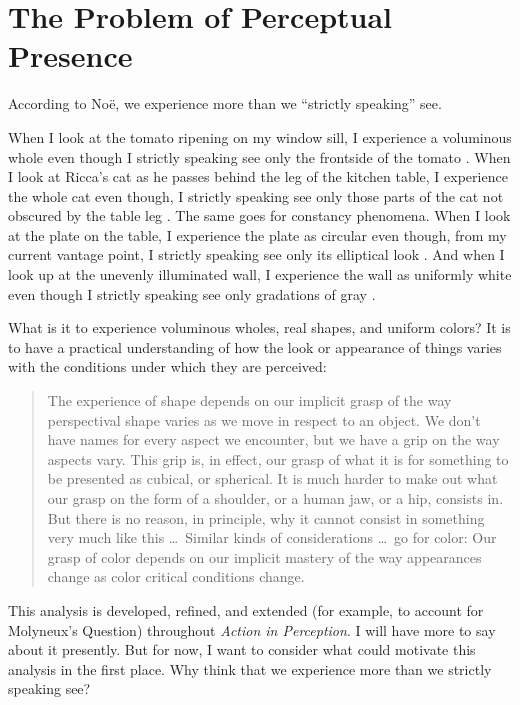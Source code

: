 \documentclass[12pt]{article}
\begin{document}

\section{The Problem of Perceptual Presence}\label{sec:the_problem_of_perceptual_presence} %

According to Noë, we experience more than we ``strictly speaking'' see. 

When I look at the tomato ripening on my window sill, I experience a voluminous whole even though I strictly speaking see only the frontside of the tomato \citep[76]{Noe:2004fk}. When I look at Ricca's cat as he passes behind the leg of the kitchen table, I experience the whole cat even though, I strictly speaking see only those parts of the cat not obscured by the table leg \citep[60]{Noe:2004fk}. The same goes for constancy phenomena. When I look at the plate on the table, I experience the plate as circular even though, from my current vantage point, I strictly speaking see only its elliptical look \citep[78--79]{Noe:2004fk}. And when I look up at the unevenly illuminated wall, I experience the wall as uniformly white even though I strictly speaking see only gradations of gray \citep[127]{Noe:2004fk}. 

What is it to experience voluminous wholes, real shapes, and uniform colors? It is to have a practical understanding of how the look or appearance of things varies with the conditions under which they are perceived:
	\begin{quote}
		The experience of shape depends on our implicit grasp of the way perspectival shape varies as we move in respect to an object. We don’t have names for every aspect we encounter, but we have a grip on the way aspects vary. This grip is, in effect, our grasp of what it is for something to be presented as cubical, or spherical. It is much harder to make out what our grasp on the form of a shoulder, or a human jaw, or a hip, consists in. But there is no reason, in principle, why it cannot consist in something very much like this \ldots\ Similar kinds of considerations \ldots\ go for color: Our grasp of color depends on our implicit mastery of the way appearances change as color critical conditions change. \citep[198--199]{Noe:2004fk}
	\end{quote}
This analysis is developed, refined, and extended (for example, to account for Molyneux's Question) throughout \emph{Action in Perception}. I will have more to say about it presently. But for now, I want to consider what could motivate this analysis in the first place. Why think that we experience more than we strictly speaking see?
\end{document}
